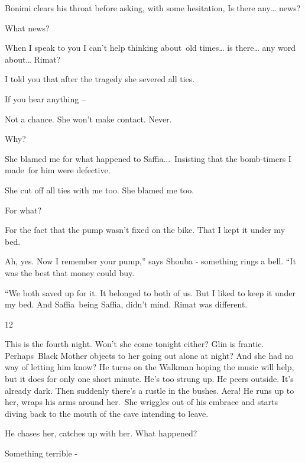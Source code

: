 \documentclass[letterpaper]{article}
\begin{document}
Bonimi clears his throat before asking, with some hesitation, {\textquotedbl} Is there any{\dots} news?{\textquotedbl} 

{\textquotedbl}What news?{\textquotedbl} 

{\textquotedbl}When I speak to you I can't help thinking about~old times{\dots} is there{\dots} any word about{\dots}
Rimat?{\textquotedbl} 

{\textquotedbl}I told you that after the tragedy she severed all ties.{\textquotedbl} 

{\textquotedbl}If you hear anything --{\textquotedbl} 

{\textquotedbl}Not a chance. She won't make contact. Never.{\textquotedbl} 

{\textquotedbl}Why?{\textquotedbl} 

{\textquotedbl}She blamed me for what happened to Saffia...\ Insisting that the bomb-timers I made\ for him were
defective.{\textquotedbl} 

{\textquotedbl}She cut off all ties with me too. She blamed me too.{\textquotedbl} 

{\textquotedbl}For what?{\textquotedbl}~ 

{\textquotedbl}For the fact that the pump wasn't fixed on the bike. That I kept it under my bed.{\textquotedbl} 

{\textquotedbl}Ah, yes. Now I remember your pump,'' says Shouba - something rings a bell. ``It was the best that money
could buy.{\textquotedbl}

{}``We both saved up for it. It belonged to both of us. But I liked to keep it under my bed. And Saffia~being Saffia,
didn't mind. Rimat was different.{\textquotedbl} 


\bigskip

12~

This is the fourth night. Won't she come tonight either? Glin is frantic. Perhaps~Black Mother objects to her going out
alone at night? And she had no way of letting him know? He turns on the Walkman hoping the music will help, but it does
for only one short minute. He's too strung up. He peers outside. It's already dark. Then suddenly there's a rustle in
the bushes. Aera! He runs up to her, wraps his arms around her.\ She wriggles out of his embrace and starts diving back
to the mouth of the cave intending to leave.

 He chases her, catches up with her. {\textquotedbl}What happened?{\textquotedbl} 

{\textquotedbl}Something terrible -{\textquotedbl} 
\end{document}

